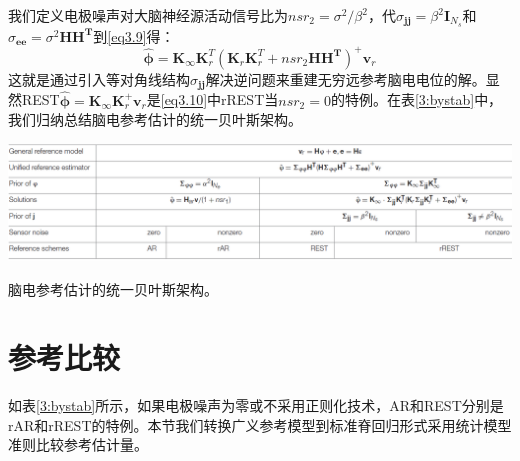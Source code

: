 我们定义电极噪声对大脑神经源活动信号比为$nsr_{2}=\sigma^{2}/\beta^{2}$，代$\sigma_{\mathbf{jj}}=\beta^{2}\mathbf{I}_{N_{s}}$和$\sigma_{\mathbf{ee}}=\sigma^{2}\mathbf{HH^{T}}$到\eqref{eq3.9}得：
\begin{equation}\label{eq3.10}
\hat{\mathbf{\phi}}=\mathbf{K}_{\infty}\mathbf{K}_{r}^{T}(\mathbf{K}_{r}\mathbf{K}_{r}^{T}+nsr_{2}\mathbf{HH^{T}})^{+}\mathbf{v}_{r}
\end{equation}
这就是通过引入等对角线结构$\sigma_{\mathbf{jj}}$解决逆问题来重建无穷远参考脑电电位的解。显然REST$\hat{\mathbf{\phi}}=\mathbf{K}_{\infty}\mathbf{K}_{r}^{+}\mathbf{v}_{r}$是\eqref{eq3.10}中rREST当$nsr_{2}=0$的特例。在表\ref{3:bystab}中，我们归纳总结脑电参考估计的统一贝叶斯架构。
\begin{table}[!h]
\includegraphics[width=\linewidth]{pic/Frontier/bayesiantab.png}
\caption{脑电参考估计的统一贝叶斯架构。}
\label{3:bystab}
\end{table}

\section{参考比较}
如表\ref{3:bystab}所示，如果电极噪声为零或不采用正则化技术，AR和REST分别是rAR和rREST的特例。本节我们转换广义参考模型到标准脊回归形式采用统计模型准则比较参考估计量。
